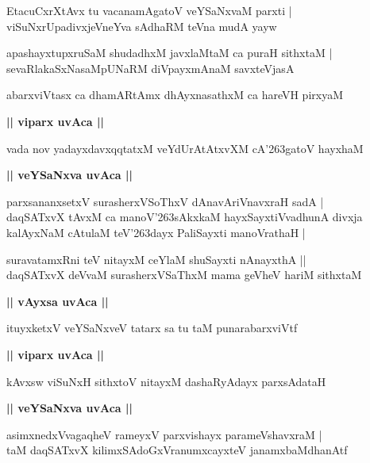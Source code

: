 \documentclass[twoside,12pt,openright]{book}
\def\S{\char'263}
\newcounter{shloka}[chapter]
\def\uvaca#1{\centerline{{\large\textbf{#1}}}}
\begin{document}
\begin{shloka}%
EtacuCxrXtAvx tu vacanamAgatoV veYSaNxvaM parxti |\\
viSuNxrUpadivxjeVneYva sAdhaRM teVna mudA yayw
\end{shloka}

\begin{shloka}%
apashayxtupxruSaM shudadhxM javxlaMtaM ca puraH sithxtaM |\\
sevaRlakaSxNasaMpUNaRM diVpayxmAnaM savxteVjasA 
\end{shloka}

\begin{shloka}%
abarxviVtasx ca dhamARtAmx dhAyxnasathxM ca hareVH pirxyaM
\end{shloka}

\uvaca{|| viparx uvAca ||}

\begin{shloka}%
vada nov yadayxdavxqqtatxM veYdUrAtAtxvXM cA\S gatoV hayxhaM 
\end{shloka}

\uvaca{|| veYSaNxva uvAca ||}

\begin{shloka}%
parxsananxsetxV surasherxVSoThxV dAnavAriVnavxraH sadA |\\
daqSATxvX tAvxM ca manoV\S sAkxkaM hayxSayxtiVvadhunA divxja \\
kalAyxNaM cAtulaM teV\S dayx PaliSayxti manoVrathaH |
\end{shloka}

\begin{shloka}%
suravatamxRni teV nitayxM ceYlaM shuSayxti nAnayxthA ||\\
daqSATxvX deVvaM surasherxVSaThxM mama geVheV hariM sithxtaM 
\end{shloka}

\uvaca{|| vAyxsa uvAca ||}

\begin{shloka}%
ituyxketxV veYSaNxveV tatarx sa tu taM punarabarxviVtf
\end{shloka}

\uvaca{|| viparx uvAca ||}

\begin{shloka}%
kAvxsw viSuNxH sithxtoV nitayxM dashaRyAdayx parxsAdataH 
\end{shloka}

\uvaca{|| veYSaNxva uvAca ||}

\begin{shloka}%
asimxnedxVvagaqheV rameyxV parxvishayx parameVshavxraM |\\
taM daqSATxvX kilimxSAdoGxVranumxcayxteV janamxbaMdhanAtf
\end{shloka}
\end{document}
